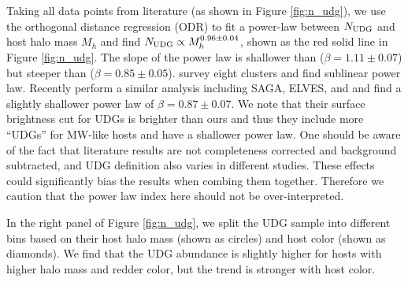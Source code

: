 \documentclass[twocolumn,astrosymb,twocolappendix]{aastex631}
\begin{document}
\begin{CJK*}{UTF8}{gbsn}
Taking all data points from literature (as shown in Figure \ref{fig:n_udg}), we use the orthogonal distance regression (ODR) to fit a power-law between $N_{\rm UDG}$ and host halo mass $M_h$ and find $N_{\rm UDG} \propto M_h^{0.96\pm 0.04}$, shown as the red solid line in Figure \ref{fig:n_udg}. The slope of the power law is shallower than \citet{vdBurg2017} ($\beta=1.11\pm0.07$) but steeper than \citet{Roman2017b} ($\beta=0.85\pm0.05$). \citet{ManceraPina2018} survey eight clusters and find sublinear power law. Recently \citet{Karunakaran2022b} perform a similar analysis including SAGA, ELVES, and \citet{Nashimoto2022} and find a slightly shallower power law of $\beta=0.87\pm0.07$. We note that their surface brightness cut for UDGs is brighter than ours and thus they include more ``UDGs'' for MW-like hosts and have a shallower power law. One should be aware of the fact that literature results are not completeness corrected and background subtracted, and UDG definition also varies in different studies. These effects could significantly bias the results when combing them together. Therefore we caution that the power law index here should not be over-interpreted. 

In the right panel of Figure \ref{fig:n_udg}, we split the UDG sample into different bins based on their host halo mass (shown as circles) and host color (shown as diamonds). We find that the UDG abundance is slightly higher for hosts with higher halo mass and redder color, but the trend is stronger with host color. 
\vspace{1em}


\end{CJK*}
\end{document}
